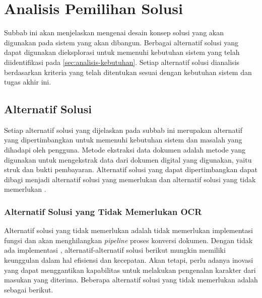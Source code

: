 \section{Analisis Pemilihan Solusi}
\label{sec:analisis-pemilihan-solusi}

Subbab ini akan menjelaskan mengenai desain konsep solusi yang akan digunakan pada sistem yang akan dibangun. Berbagai alternatif solusi yang dapat digunakan dieksplorasi untuk memenuhi kebutuhan sistem yang telah diidentifikasi pada \autoref{sec:analisis-kebutuhan}. Setiap alternatif solusi dianalisis berdasarkan kriteria yang telah ditentukan sesuai dengan kebutuhan sistem dan tugas akhir ini.

\subsection{Alternatif Solusi}
\label{subsec:alternatif-solusi}
Setiap alternatif solusi yang dijelaskan pada subbab ini merupakan alternatif yang dipertimbangkan untuk memenuhi kebutuhan sistem dan masalah yang dihadapi oleh pengguna. Metode ekstraksi data dokumen adalah metode yang digunakan untuk mengekstrak data dari dokumen digital yang digunakan, yaitu struk dan bukti pembayaran. Alternatif solusi yang dapat dipertimbangkan dapat dibagi menjadi alternatif solusi yang memerlukan \ocr{} dan alternatif solusi yang tidak memerlukan \ocr. 

\subsubsection{Alternatif Solusi yang Tidak Memerlukan OCR}
\label{subsubsec:alternatif-solusi-tidak-memerlukan-ocr}
Alternatif solusi yang tidak memerlukan \ocr{} adalah tidak memerlukan implementasi fungsi \ocr{} dan akan menghilangkan \emph{pipeline} proses konversi dokumen. Dengan tidak ada implementasi \ocr, alternatif-alternatif solusi berikut mungkin memiliki keunggulan dalam hal efisiensi dan kecepatan. Akan tetapi, perlu adanya inovasi yang dapat menggantikan  kapabilitas \ocr{} untuk melakukan pengenalan karakter dari masukan yang diterima. Beberapa alternatif solusi yang tidak memerlukan \ocr{} adalah sebagai berikut.

